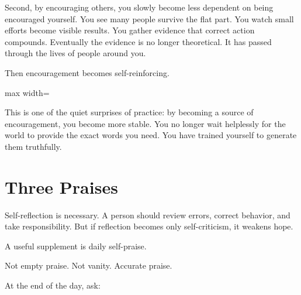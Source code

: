 Second, by encouraging others, you slowly become less dependent on being encouraged yourself. You see many people survive the flat part. You watch small efforts become visible results. You gather evidence that correct action compounds. Eventually the evidence is no longer theoretical. It has passed through the lives of people around you.

Then encouragement becomes self-reinforcing.

\begin{center}
\begin{adjustbox}{max width=\linewidth}
\end{adjustbox}
\end{center}

This is one of the quiet surprises of practice: by becoming a source of encouragement, you become more stable. You no longer wait helplessly for the world to provide the exact words you need. You have trained yourself to generate them truthfully.

\section*{Three Praises}

Self-reflection is necessary. A person should review errors, correct behavior, and take responsibility. But if reflection becomes only self-criticism, it weakens hope.

A useful supplement is daily self-praise.

Not empty praise. Not vanity. Accurate praise.

At the end of the day, ask:


